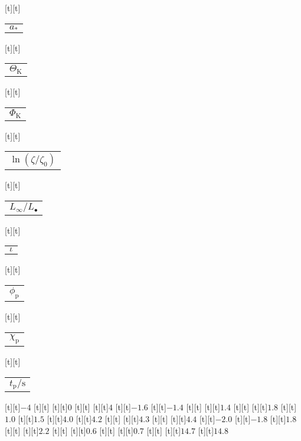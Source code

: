 \begin{psfrags}
[t][t]{\color[rgb]{0,0,0}\setlength{\tabcolsep}{0pt}\begin{tabular}{c}{$a_\ast$}\end{tabular}}%
[t][t]{\color[rgb]{0,0,0}\setlength{\tabcolsep}{0pt}\begin{tabular}{c}{$\Theta_\mathrm{K}$}\end{tabular}}%
[t][t]{\color[rgb]{0,0,0}\setlength{\tabcolsep}{0pt}\begin{tabular}{c}{$\Phi_\mathrm{K}$}\end{tabular}}%
[t][t]{\color[rgb]{0,0,0}\setlength{\tabcolsep}{0pt}\begin{tabular}{c}{$\ln(\zeta/\zeta_0)$}\end{tabular}}%
[t][t]{\color[rgb]{0,0,0}\setlength{\tabcolsep}{0pt}\begin{tabular}{c}{$L_\infty/L_\bullet$}\end{tabular}}%
[t][t]{\color[rgb]{0,0,0}\setlength{\tabcolsep}{0pt}\begin{tabular}{c}{$\iota$}\end{tabular}}%
[t][t]{\color[rgb]{0,0,0}\setlength{\tabcolsep}{0pt}\begin{tabular}{c}{$\phi_\mathrm{p}$}\end{tabular}}%
[t][t]{\color[rgb]{0,0,0}\setlength{\tabcolsep}{0pt}\begin{tabular}{c}{$\chi_\mathrm{p}$}\end{tabular}}%
[t][t]{\color[rgb]{0,0,0}\setlength{\tabcolsep}{0pt}\begin{tabular}{c}{$t_\mathrm{p}/\mathrm{s}$}\end{tabular}}%
%
[t][t]{$-4$}%
[t][t]{}%
[t][t]{$0$}%
[t][t]{}%
[t][t]{$4$}%
[t][t]{$-1.6$}%
[t][t]{$-1.4$}%
[t][t]{}%
[t][t]{$1.4$}%
[t][t]{}%
[t][t]{$1.8$}%
[t][t]{$1.0$}%
[t][t]{$1.5$}%
[t][t]{$4.0$}%
[t][t]{$4.2$}%
[t][t]{}%
[t][t]{$4.3$}%
[t][t]{}%
[t][t]{$4.4$}%
[t][t]{$-2.0$}%
[t][t]{$-1.8$}%
[t][t]{$1.8$}%
[t][t]{}%
[t][t]{$2.2$}%
[t][t]{}%
[t][t]{$0.6$}%
[t][t]{}%
[t][t]{$0.7$}%
[t][t]{}%
[t][t]{$14.7$}%
[t][t]{$14.8$}%

\end{psfrags}
